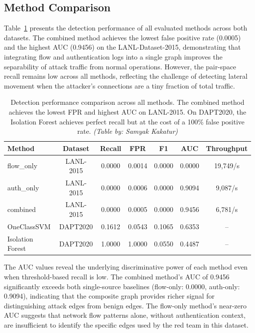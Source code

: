 \documentclass[letterpaper,twocolumn,10pt]{article}
\begin{document}
\subsection{Method Comparison}

Table~\ref{tab:comparison} presents the detection performance of all evaluated methods across both datasets. The combined method achieves the lowest false positive rate (0.0005) and the highest AUC (0.9456) on the LANL-Dataset-2015, demonstrating that integrating flow and authentication logs into a single graph improves the separability of attack traffic from normal operations. However, the pair-space recall remains low across all methods, reflecting the challenge of detecting lateral movement when the attacker's connections are a tiny fraction of total traffic.

\begin{table}[t]
\centering
\caption{Detection performance comparison across all methods. The combined method achieves the lowest FPR and highest AUC on LANL-2015. On DAPT2020, the Isolation Forest achieves perfect recall but at the cost of a 100\% false positive rate. \textit{(Table by: Samyak Kakatur)}}
\label{tab:comparison}
\footnotesize
\begin{tabular}{lcccccc}
\toprule
\textbf{Method} & \textbf{Dataset} & \textbf{Recall} & \textbf{FPR} & \textbf{F1} & \textbf{AUC} & \textbf{Throughput} \\
\midrule
flow\_only & LANL-2015 & 0.0000 & 0.0014 & 0.0000 & 0.0000 & 19,749/s \\
auth\_only & LANL-2015 & 0.0000 & 0.0006 & 0.0000 & 0.9094 & 9,087/s \\
combined & LANL-2015 & 0.0000 & 0.0005 & 0.0000 & 0.9456 & 6,781/s \\
OneClassSVM & DAPT2020 & 0.1612 & 0.0543 & 0.1065 & 0.6353 & -- \\
Isolation Forest & DAPT2020 & 1.0000 & 1.0000 & 0.0550 & 0.4487 & -- \\
\bottomrule
\end{tabular}
\end{table}

The AUC values reveal the underlying discriminative power of each method even when threshold-based recall is low. The combined method's AUC of 0.9456 significantly exceeds both single-source baselines (flow-only: 0.0000, auth-only: 0.9094), indicating that the composite graph provides richer signal for distinguishing attack edges from benign edges. The flow-only method's near-zero AUC suggests that network flow patterns alone, without authentication context, are insufficient to identify the specific edges used by the red team in this dataset.
\end{document}
